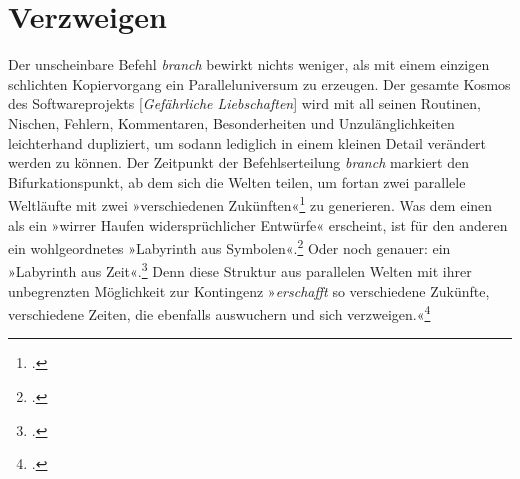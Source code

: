 \documentclass[a4paper,11pt]{article}
\newcommand{\anf}[1]{»#1«}
\begin{document}
\enlargethispage{6mm}

\section{Verzweigen}

Der unscheinbare Befehl \emph{branch} bewirkt nichts weniger, als mit einem einzigen schlichten Kopiervorgang ein Paralleluniversum zu erzeugen. Der gesamte Kosmos des Softwareprojekts [\emph{Gefährliche Liebschaften}] wird mit all seinen Routinen, Nischen, Fehlern, Kommentaren, Besonderheiten und Unzulänglichkeiten leichterhand dupliziert, um sodann lediglich in einem kleinen Detail verändert werden zu können. Der Zeitpunkt der Befehlserteilung \emph{branch} markiert den Bifurkationspunkt, ab dem sich die Welten teilen, um fortan zwei parallele Weltläufte mit zwei \anf{verschiedenen Zukünften}\footcite[169]{borges:1941} zu generieren. Was dem einen als ein \anf{wirrer Haufen widersprüchlicher Entwürfe} erscheint, ist für den anderen ein wohlgeordnetes \anf{Labyrinth aus Symbolen}.\footcite[168]{borges:1941} Oder noch genauer: ein \anf{Labyrinth aus Zeit}.\footcite[168]{borges:1941} Denn diese Struktur aus parallelen Welten mit ihrer unbegrenzten Möglichkeit zur Kontingenz \anf{\emph{erschafft} so verschiedene Zukünfte, verschiedene Zeiten, die ebenfalls auswuchern und sich verzweigen.}\footcite[170]{borges:1941} 
\end{document}

